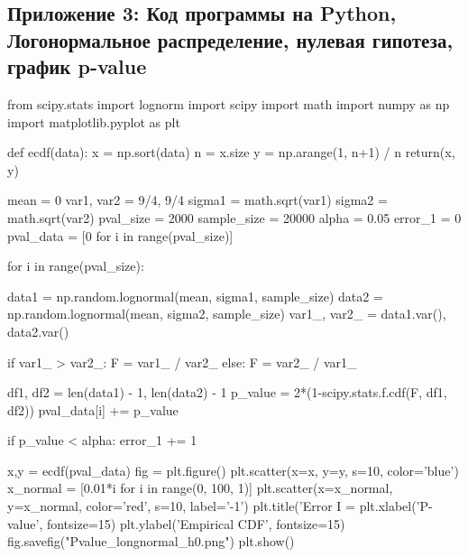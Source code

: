\documentclass[12pt]{disser}
\begin{document}
\subsection*{Приложение 3: Код программы на Python, Логонормальное распределение, нулевая гипотеза, график p-value}
\begin{python}
from scipy.stats import lognorm
import scipy
import math
import numpy as np
import matplotlib.pyplot as plt


def ecdf(data):
    x = np.sort(data)
    n = x.size
    y = np.arange(1, n+1) / n
    return(x, y)


mean = 0
var1, var2 = 9/4, 9/4
sigma1 = math.sqrt(var1)
sigma2 = math.sqrt(var2)
pval_size = 2000
sample_size = 20000
alpha = 0.05
error_1 = 0
pval_data = [0 for i in range(pval_size)]

for i in range(pval_size):

    data1 = np.random.lognormal(mean, sigma1, sample_size)
    data2 = np.random.lognormal(mean, sigma2, sample_size)
    var1_, var2_ = data1.var(), data2.var()

    if var1_ > var2_:
        F = var1_ / var2_
    else:
        F = var2_ / var1_

    df1, df2 = len(data1) - 1, len(data2) - 1
    p_value = 2*(1-scipy.stats.f.cdf(F, df1, df2))
    pval_data[i] += p_value

    if p_value < alpha:
        error_1 += 1

x,y = ecdf(pval_data)
fig = plt.figure()
plt.scatter(x=x, y=y, s=10, color='blue')
x_normal = [0.01*i for i in range(0, 100, 1)]
plt.scatter(x=x_normal, y=x_normal, color='red', s=10, label='-1')
plt.title('Error I = %
plt.xlabel('P-value', fontsize=15)
plt.ylabel('Empirical CDF', fontsize=15)
fig.savefig("Pvalue_longnormal_h0.png")
plt.show()
\end{python}
\end{document}
